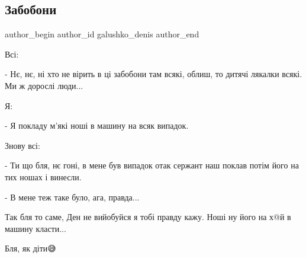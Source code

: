  
 
 
 
 

\subsection{Забобони}
\label{sec:18_11_2022.fb.galushko_denis.1.zaboboni}

\ifcmt
 author_begin
   author_id galushko_denis
 author_end
\fi

Всі:

- Нє, нє, ні хто не вірить в ці забобони там всякі, облиш, то дитячі лякалки
всякі. Ми ж дорослі люди...

Я:

- Я покладу м'які ноші в машину на всяк випадок.

Знову всі:

- Ти що бля, нє гоні, в мене був випадок отак сержант наш поклав потім його на
тих ношах і винесли. 

- В мене теж таке було, ага, правда...

Так бля то саме, Ден не вийобуйся я тобі правду кажу. Ноші ну його на х@й  в
машину класти...

Бля, як діти😅
